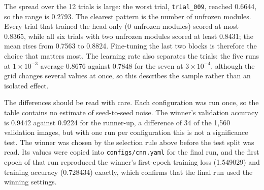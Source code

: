 The spread over the 12 trials is large: the worst trial, \texttt{trial\_009}, reached 0.6644, so the range is 0.2793. The clearest pattern is the number of unfrozen modules. Every trial that trained the head only (0 unfrozen modules) scored at most 0.8365, while all six trials with two unfrozen modules scored at least 0.8431; the mean rises from 0.7563 to 0.8824. Fine-tuning the last two blocks is therefore the choice that matters most. The learning rate also separates the trials: the five runs at $1\times10^{-3}$ average 0.8676 against 0.7848 for the seven at $3\times10^{-4}$, although the grid changes several values at once, so this describes the sample rather than an isolated effect.

The differences should be read with care. Each configuration was run once, so the table contains no estimate of seed-to-seed noise. The winner's validation accuracy is 0.9442 against 0.9224 for the runner-up, a difference of 34 of the 1{,}560 validation images, but with one run per configuration this is not a significance test. The winner was chosen by the selection rule above before the test split was read. Its values were copied into \texttt{configs/cnn.yaml} for the final run, and the first epoch of that run reproduced the winner's first-epoch training loss (1.549029) and training accuracy (0.728434) exactly, which confirms that the final run used the winning settings.
